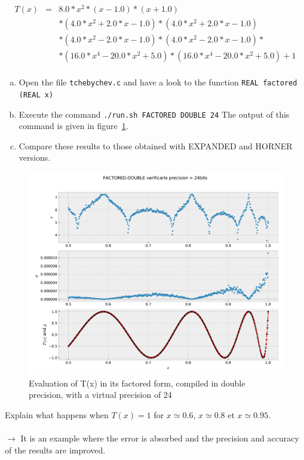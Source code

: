 \documentclass{TP}
\begin{document}
\begin{eqnarray*}
T(x) &=& 8.0*x^2*(x - 1.0)*(x + 1.0) \\
 & & * (4.0*x^2 + 2.0*x - 1.0)*(4.0*x^2 + 2.0*x - 1.0) \\
 & & * (4.0*x^2 - 2.0*x - 1.0)*(4.0*x^2 - 2.0*x - 1.0)* \\
 & & * (16.0*x^4 - 20.0*x^2 + 5.0)*(16.0*x^4 - 20.0*x^2 + 5.0) + 1 \\
\end{eqnarray*}

\begin{question}
  \begin{enumerate}[(a)]
  \item Open the file {\tt tchebychev.c} and have a look to the function {\tt REAL factored (REAL x)}
\item Execute the command {\tt ./run.sh FACTORED DOUBLE 24} \newline
The output of this command is given in figure~\ref{fig:factored:double:24}.
\item Compare these results to those obtained with EXPANDED and HORNER versions.
  \end{enumerate}
\end{question}

\begin{figure}[h]
\center \includegraphics[width=.8\textwidth]{FACTORED-DOUBLE-24.pdf}
  \caption{Evaluation of T(x) in its factored form, compiled in double precision, with a virtual precision of 24}
  \label{fig:factored:double:24}
\end{figure}

\begin{question}
  Explain what happens when $T(x)=1$ for $x\simeq 0.6$,
  $x\simeq 0.8$ et $x\simeq 0.95$.\\~\\
  $\rightarrow$ It is an example where the error is absorbed and the precision and accuracy  of the results are improved.
\end{question}
\end{document}
